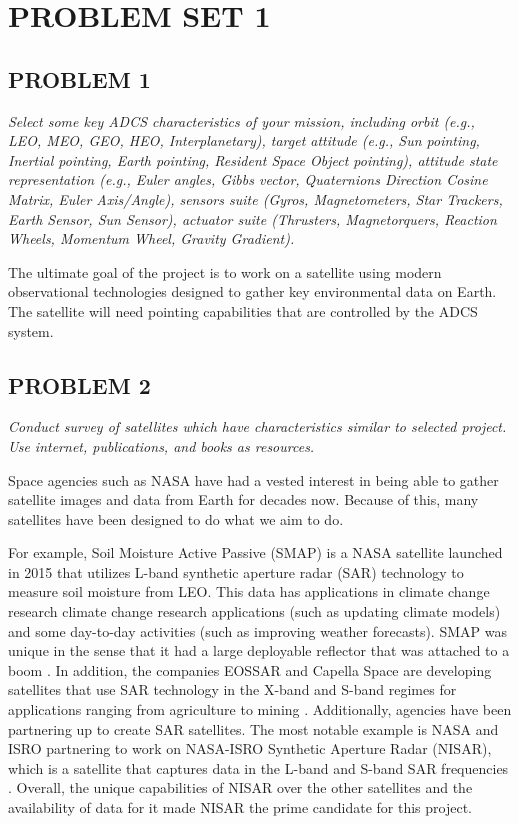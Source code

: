 \section{\Large PROBLEM SET 1}
\subsection{PROBLEM 1}
\textit{Select some key ADCS characteristics of your mission, including orbit (e.g., LEO, MEO, GEO, HEO, Interplanetary), target attitude (e.g., Sun pointing, Inertial pointing, Earth pointing, Resident Space Object pointing), attitude state representation (e.g., Euler angles, Gibbs vector, Quaternions Direction Cosine Matrix, Euler Axis/Angle), sensors suite (Gyros, Magnetometers, Star Trackers, Earth Sensor, Sun Sensor), actuator suite (Thrusters, Magnetorquers, Reaction Wheels, Momentum Wheel, Gravity Gradient).}

The ultimate goal of the project is to work on a satellite using modern observational technologies designed to gather key environmental data on Earth. The satellite will need pointing capabilities that are controlled by the ADCS system.

\subsection{PROBLEM 2}
\textit{Conduct survey of satellites which have characteristics similar to selected project. Use internet, publications, and books as resources.}

Space agencies such as NASA have had a vested interest in being able to gather satellite images and data from Earth for decades now. Because of this, many satellites have been designed to do what we aim to do.

For example, Soil Moisture Active Passive (SMAP) is a NASA satellite launched in 2015 that utilizes L-band synthetic aperture radar (SAR) technology to measure soil moisture from LEO. This data has applications in climate change research climate change research applications (such as updating climate models) and some day-to-day activities (such as improving weather forecasts). SMAP was unique in the sense that it had a large deployable reflector that was attached to a boom \cite{SMAP}. In addition, the companies EOSSAR and Capella Space are developing satellites that use SAR technology in the X-band and S-band regimes for applications ranging from agriculture to mining \cite{EOSSAR, Capella}. Additionally, agencies have been partnering up to create SAR satellites. The most notable example is NASA and ISRO partnering to work on NASA-ISRO Synthetic Aperture Radar (NISAR), which is a satellite that captures data in the L-band and S-band SAR frequencies \cite{NisarMission}. Overall, the unique capabilities of NISAR over the other satellites and the availability of data for it made NISAR the prime candidate for this project.

